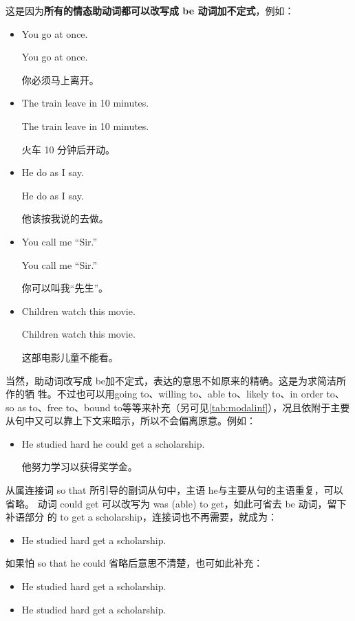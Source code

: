 这是因为\textbf{所有的情态助动词都可以改写成 be 动词加不定式}，例如：
\begin{itemize}
\item   You  go at once.

  \reitem You  go at once.

  你必须马上离开。
\item The train  leave in 10 minutes.

\reitem The train  leave in 10 minutes.

火车 10 分钟后开动。

\item   He  do as I say.

  \reitem He  do as I say.

  他该按我说的去做。

\item   You  call me “Sir.”

  \reitem You  call me “Sir.”

  你可以叫我“先生”。

\item Children  watch this movie.

  \reitem Children  watch this movie.

  这部电影儿童不能看。
\end{itemize}

当然，助动词改写成 be加不定式，表达的意思不如原来的精确。这是为求简洁所作的牺
牲。不过也可以用going to、willing to、able to、likely to、in order to、so as
to、free to、bound to等等来补充（另可见\cref{tab:modalinf}），况且依附于主要
从句中又可以靠上下文来暗示，所以不会偏离原意。例如：

\begin{itemize}
\item He studied hard  he could get a scholarship.

  他努力学习以获得奖学金。
\end{itemize}
从属连接词 so that 所引导的副词从句中，主语 he与主要从句的主语重复，可以省略。
动词 could get 可以改写为 was (able) to get，如此可省去 be 动词，留下补语部分
的 to get a scholarship，连接词也不再需要，就成为：
\begin{itemize}
\item He studied hard  get a scholarship.
\end{itemize}
如果怕 so that he could 省略后意思不清楚，也可如此补充：
\begin{itemize}
\item   He studied hard  get a scholarship.
\item   He studied hard  get a scholarship.
\end{itemize}

